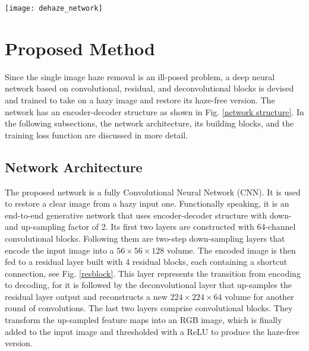 \documentclass[journal]{IEEEtran}
\begin{document}


%



\begin{figure*}
	\centering
	\texttt{[image: dehaze\_network]}
	\captionsetup{justification=centering}
	\centering\caption{Structure and details of GMAN. The yellow blocks are convolutional layers, the green blocks are down-sampling layers and deconvolutional layers. We cascade 4 residual blocks shown as blue blocks, and the number of convolutional layers inside are 2, 2, 3, 4.}
	\label{network structure}
\end{figure*}

\section{Proposed Method}

Since the single image haze removal is an ill-posed problem, a deep neural network based on convolutional, residual, and deconvolutional blocks is devised and trained to take on a hazy image and restore its haze-free version. The network has an encoder-decoder structure as shown in Fig. \ref{network structure}. In the following subsections, the network architecture, its building blocks, and the training loss function are discussed in more detail.

\subsection{Network Architecture}

The proposed network is a fully Convolutional Neural Network (CNN). It is used to restore a clear image from a hazy input one. Functionally speaking, it is an end-to-end generative network that uses encoder-decoder structure with down- and up-sampling factor of 2. Its first two layers are constructed with 64-channel convolutional blocks. Following them are two-step down-sampling layers that encode the input image into a $56\times56\times 128$ volume. The encoded image is then fed to a residual layer built with 4 residual blocks, each containing a shortcut connection, see Fig. \ref{resblock}. This layer represents the transition from encoding to decoding, for it is followed by the deconvolutional layer that up-samples the residual layer output and reconstructs a new $224\times224\times64$ volume for another round of convolutions. The last two layers comprise convolutional blocks. They transform the up-sampled feature maps into an RGB image, which is finally added to the input image and thresholded with a ReLU to produce the haze-free version.
\end{document}
